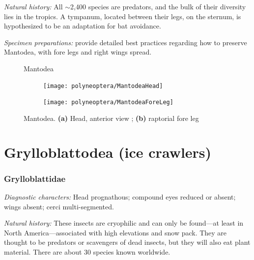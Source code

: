\noindent{}\textit{Natural history:} All $\sim$2,400 species are predators, and the bulk of their diversity lies in the tropics. A tympanum, located between their legs, on the sternum, is hypothesized to be an adaptation for bat avoidance.\vspace{3mm}

\noindent{}\textit{Specimen preparations:} \cite{mantidPreservation} provide detailed best practices regarding how to preserve Mantodea, with fore legs and right wings spread.\vspace{3mm}

\begin{figure}[ht!]
  \centering
  \caption{Mantodea \citep[modified from][plate 78]{bhlitem122043}}
  \label{fig:mantidbody}
\end{figure}

\begin{figure}[ht!]
    \centering
    \begin{subfigure}[ht!]{0.35\textwidth}
        \texttt{[image: polyneoptera/MantodeaHead]}
        \caption{}
        \label{fig:mantodea1}
    \end{subfigure}
    \qquad
    \begin{subfigure}[ht!]{0.45\textwidth}
        \texttt{[image: polyneoptera/MantodeaForeLeg]}
        \caption{}
        \label{fig:mantodea2}
    \end{subfigure}
    \caption{Mantodea. \textbf{(a)} Head, anterior view \citep[modified from][Plate 130, Fig. 1a]{bhl24070}; \textbf{(b)} raptorial fore leg \citep[modified from][Plate 130, Fig. 1f]{bhl24070}}\label{fig:mantodeans}
\end{figure}

\section{Grylloblattodea (ice crawlers)}
\subsubsection{Grylloblattidae}
\noindent{}\textit{Diagnostic characters:} Head prognathous; compound eyes reduced or absent; wings absent; cerci multi-segmented.\vspace{3mm}

\noindent{}\textit{Natural history:} These insects are cryophilic and can only be found---at least in North America---associated with high elevations and snow pack. They are thought to be predators or scavengers of dead insects, but they will also eat plant material. There are about 30 species known worldwide.\vspace{3mm}

